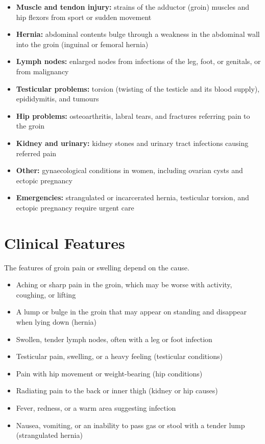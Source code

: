 \begin{itemize}
    \item \textbf{Muscle and tendon injury:} strains of the adductor (groin) muscles and hip flexors from sport or sudden movement
    \item \textbf{Hernia:} abdominal contents bulge through a weakness in the abdominal wall into the groin (inguinal or femoral hernia)
    \item \textbf{Lymph nodes:} enlarged nodes from infections of the leg, foot, or genitals, or from malignancy
    \item \textbf{Testicular problems:} torsion (twisting of the testicle and its blood supply), epididymitis, and tumours
    \item \textbf{Hip problems:} osteoarthritis, labral tears, and fractures referring pain to the groin
    \item \textbf{Kidney and urinary:} kidney stones and urinary tract infections causing referred pain
    \item \textbf{Other:} gynaecological conditions in women, including ovarian cysts and ectopic pregnancy
    \item \textbf{Emergencies:} strangulated or incarcerated hernia, testicular torsion, and ectopic pregnancy require urgent care
\end{itemize}

\section*{Clinical Features}
The features of groin pain or swelling depend on the cause.

\begin{itemize}
    \item Aching or sharp pain in the groin, which may be worse with activity, coughing, or lifting
    \item A lump or bulge in the groin that may appear on standing and disappear when lying down (hernia)
    \item Swollen, tender lymph nodes, often with a leg or foot infection
    \item Testicular pain, swelling, or a heavy feeling (testicular conditions)
    \item Pain with hip movement or weight-bearing (hip conditions)
    \item Radiating pain to the back or inner thigh (kidney or hip causes)
    \item Fever, redness, or a warm area suggesting infection
    \item Nausea, vomiting, or an inability to pass gas or stool with a tender lump (strangulated hernia)
\end{itemize}

